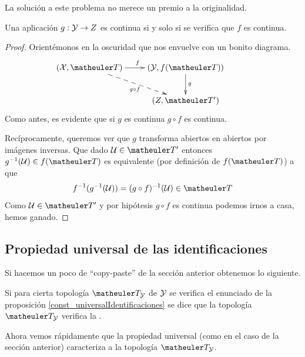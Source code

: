 La solución a este problema no merece un premio a la originalidad.
\begin{prop}
	\label{const_universalIdentificaciones}
	Una aplicación $g:\mathcal{Y}\to Z$ es continua si y solo si se verifica que $f$ es continua.
\end{prop}
\begin{proof}
	Orientémonos en la oscuridad que nos envuelve con un bonito diagrama.
	\begin{equation*}
		\xymatrix{
			(\X,\T) \ar[r]^f \ar@{-->}[rd]_{g\circ f} &
			(\Y,f(\T)) \ar[d]^g & \\
			&(Z,\T')
		}
	\end{equation*}
	Como antes, es evidente que si $g$ es continua $g\circ f$ es continua.
	
	Recíprocamente, queremos ver que $g$ transforma abiertos en abiertos por imágenes inversas. Que dado $\U\in\T'$ entonces $g^{-1}(\U)\in f(\T)$ es equivalente (por definición de $f(\T)$) a que
	\[f^{-1}(g^{-1}(\U))=(g\circ f)^{-1}(\U)\in\T\]
	Como $\U\in\T'$ y por hipótesis $g\circ f$ es continua podemos irnos a casa, hemos ganado.
\end{proof}
\subsection{Propiedad universal de las identificaciones}
Si hacemos un poco de ``copy-paste'' de la sección anterior obtenemos lo siguiente. 
\begin{defi}
	Si para cierta topología $\T_\Y$ de $\mathcal{Y}$ se verifica el enunciado de la proposición \ref{const_universalIdentificaciones} se dice que la topología $\T_\Y$ verifica la .
\end{defi}
Ahora vemos rápidamente que la propiedad universal (como en el caso de la sección anterior) caracteriza a la topología $\T_\Y$.

